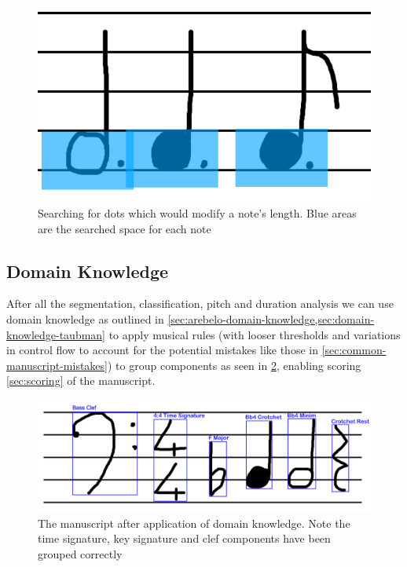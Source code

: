 \begin{figure}[H]
  \includegraphics[width=\linewidth]{gfx/implementation/dot-identification.png}
  \caption{Searching for dots which would modify a note's length. Blue areas are the searched space for each note}
  \label{fig:identify-dot}
\end{figure}

\subsection{Domain Knowledge}
\label{sec:identification-domain-knowledge}

After all the segmentation, classification, pitch and duration analysis we can use domain knowledge as outlined in \cref{sec:arebelo-domain-knowledge,sec:domain-knowledge-taubman} to apply musical rules (with looser thresholds and variations in control flow to account for the potential mistakes like those in \cref{sec:common-manuscript-mistakes}) to group components as seen in \cref{fig:canvas-domain-knowledge}, enabling scoring \cref{sec:scoring} of the manuscript.

\begin{figure}[hbt]
  \includegraphics[width=\linewidth]{gfx/techniques/labelling/domain-knowledge.png}
  \caption{The manuscript after application of domain knowledge. Note the time signature, key signature and clef components have been grouped correctly}
  \label{fig:canvas-domain-knowledge}
\end{figure}
